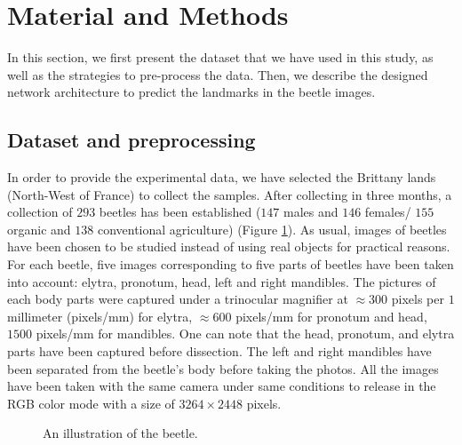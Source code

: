 \documentclass[review]{elsarticle}
\begin{document}
\section{Material and Methods}
\label{sec2}
In this section, we first present the dataset that we have used in this study, as well as the strategies to pre-process the data. Then, we describe the designed network architecture to predict the landmarks in the beetle images.

\subsection{Dataset and preprocessing}
\label{subsec21}
In order to provide the experimental data, we have selected the Brittany lands (North-West of France) to collect the samples. After collecting in three months, a collection of $293$ beetles has been established ($147$ males and $146$ females/ $155$ organic and $138$ conventional agriculture) (Figure \ref{imgbeetle}). As usual, images of beetles have been chosen to be studied instead of using real objects for practical reasons. For each beetle, five images corresponding to five parts of beetles have been taken into account: elytra, pronotum, head, left and right mandibles. The pictures of each body parts were captured under a trinocular magnifier at $\approx 300$ pixels per $1$ millimeter (pixels/mm) for elytra, $\approx 600$ pixels/mm for pronotum and head, $1500$ pixels/mm for mandibles. One can note that the head, pronotum, and elytra parts have been captured before dissection. The left and right mandibles have been separated from the beetle's body before taking the photos. All the images have been taken with the same camera under same conditions to release in the RGB color mode with a size of $3264 \times 2448$ pixels.

\begin{figure}[h!]
	\centering
	\caption{An illustration of the beetle.}
	\label{imgbeetle}
\end{figure}
\end{document}
